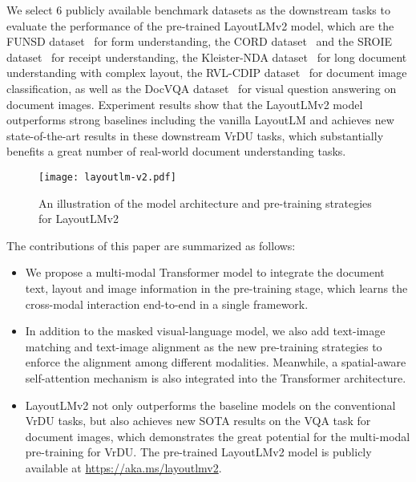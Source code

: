 \documentclass{article} \usepackage{iclr2021_conference,times}
\begin{document}
We select 6 publicly available benchmark datasets as the downstream tasks to evaluate the performance of the pre-trained LayoutLMv2 model, which are the FUNSD dataset~\citep{Jaume_2019} for form understanding, the CORD dataset~\citep{park2019cord} and the SROIE dataset~\citep{8977955} for receipt understanding, \iffalse \footnote{\scriptsize \url{https://rrc.cvc.uab.es/?ch=13}} \fi the Kleister-NDA dataset~\citep{graliski2020kleister} for long document understanding with complex layout, the RVL-CDIP dataset~\citep{harley2015icdar} for document image classification, as well as the DocVQA dataset~\citep{mathew2020docvqa} for visual question answering on document images. Experiment results show that the LayoutLMv2 model outperforms strong baselines including the vanilla LayoutLM and achieves new state-of-the-art results in these downstream VrDU tasks, which substantially benefits a great number of real-world document understanding tasks.

\begin{figure*}[t]
    \centering
    \texttt{[image: layoutlm-v2.pdf]}
    \caption{An illustration of the model architecture and pre-training strategies for LayoutLMv2}
    \label{fig:2.LayoutLMv2}
\end{figure*}

The contributions of this paper are summarized as follows:

\begin{itemize}

    \item We propose a multi-modal Transformer model to integrate the document text, layout and image information in the pre-training stage, which learns the cross-modal interaction end-to-end in a single framework.
    \item In addition to the masked visual-language model, we also add text-image matching and text-image alignment as the new pre-training strategies to enforce the alignment among different modalities. Meanwhile, a spatial-aware self-attention mechanism is also integrated into the Transformer architecture.
    \item LayoutLMv2 not only outperforms the baseline models on the conventional VrDU tasks, but also achieves new SOTA results on the VQA task for document images, which demonstrates the great potential for the multi-modal pre-training for VrDU. The pre-trained LayoutLMv2 model is publicly available at \url{https://aka.ms/layoutlmv2}.
\end{itemize}
\end{document}
